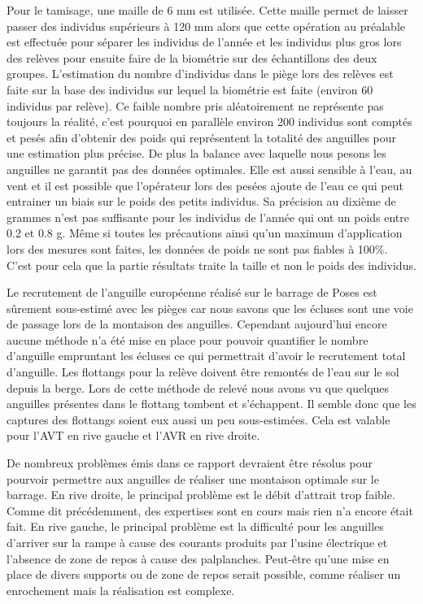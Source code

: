 \documentclass[11pt,titlepage,twoside]{article}\usepackage[]{graphicx}\usepackage[table]{xcolor}
\begin{document}
\vspace{0.5cm}
Pour le tamisage, une maille de 6 mm est utilisée. Cette maille permet de laisser passer des individus supérieurs à 120 mm alors que cette opération au préalable est effectuée pour séparer les individus de l’année et les individus plus gros lors des relèves pour ensuite faire de la biométrie sur des échantillons des deux groupes. L’estimation du nombre d’individus dans le piège lors des relèves est faite sur la base des individus sur lequel la biométrie est faite (environ 60 individus par relève). Ce faible nombre pris aléatoirement ne représente pas toujours la réalité, c’est pourquoi en parallèle environ 200 individus sont comptés et pesés afin d’obtenir des poids qui représentent la totalité des anguilles pour une estimation plus précise. De plus la balance avec laquelle nous pesons les anguilles ne garantit pas des données optimales. Elle est aussi sensible à l’eau, au vent et il est possible que l’opérateur lors des pesées ajoute de l’eau ce qui peut entrainer un biais sur le poids des petits individus. Sa précision au dixième de grammes n’est pas suffisante pour les individus de l’année qui ont un poids entre 0.2 et 0.8 g. Même si toutes les précautions ainsi qu’un maximum d’application lors des mesures sont faites, les données de poids ne sont pas fiables à 100\%. C’est pour cela que la partie résultats traite la taille et non le poids des individus.

\vspace{0.5cm}
Le recrutement de l’anguille européenne réalisé sur le barrage de Poses est sûrement sous-estimé avec les pièges car nous savons que les écluses sont une voie de passage lors de la montaison des anguilles. Cependant aujourd’hui encore aucune méthode n’a été mise en place pour pouvoir quantifier le nombre d’anguille empruntant les écluses ce qui permettrait d’avoir le recrutement total d’anguille.
Les flottangs pour la relève doivent être remontés de l’eau sur le sol depuis la berge. Lors de cette méthode de relevé nous avons vu que quelques anguilles présentes dans le flottang tombent et s’échappent. Il semble donc que les captures des flottangs soient eux aussi un peu sous-estimées. Cela est valable pour l’AVT en rive gauche et l’AVR en rive droite.

\vspace{0.5cm}
De nombreux problèmes émis dans ce rapport devraient être résolus pour pourvoir permettre aux anguilles de réaliser une montaison optimale sur le barrage. En rive droite, le principal problème est le débit d’attrait trop faible. Comme dit précédemment, des expertises sont en cours mais rien n’a encore était fait. En rive gauche, le principal problème est la difficulté pour les anguilles d’arriver sur la rampe à cause des courants produits par l’usine électrique et l’absence de zone de repos à cause des palplanches. Peut-être qu’une mise en place de divers supports ou de zone de repos serait possible, comme réaliser un enrochement mais la réalisation est complexe.
\end{document}
